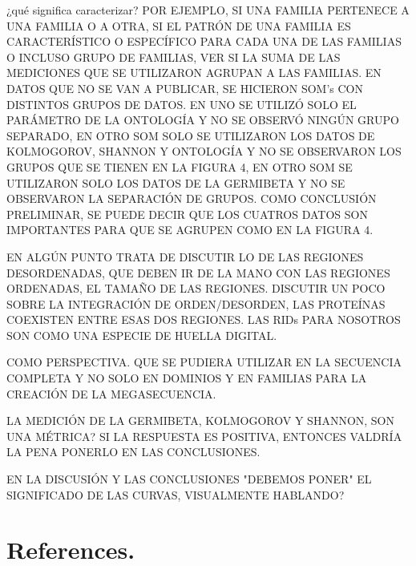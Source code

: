\documentclass[preprint,12pt]{elsarticle}
\begin{document}
¿qué significa caracterizar? POR EJEMPLO, SI UNA FAMILIA PERTENECE A UNA FAMILIA O A OTRA, SI EL PATRÓN DE UNA FAMILIA ES CARACTERÍSTICO O ESPECÍFICO PARA CADA UNA DE LAS FAMILIAS O INCLUSO GRUPO DE FAMILIAS, VER SI LA SUMA DE LAS MEDICIONES QUE SE UTILIZARON AGRUPAN A LAS FAMILIAS.
EN DATOS QUE NO SE VAN A PUBLICAR, SE HICIERON SOM's CON DISTINTOS GRUPOS DE DATOS. EN UNO SE UTILIZÓ SOLO EL PARÁMETRO DE LA ONTOLOGÍA Y NO SE OBSERVÓ NINGÚN GRUPO SEPARADO, EN OTRO SOM SOLO SE UTILIZARON LOS DATOS DE KOLMOGOROV, SHANNON Y ONTOLOGÍA Y NO SE OBSERVARON LOS GRUPOS QUE SE TIENEN EN LA FIGURA 4, EN OTRO SOM SE UTILIZARON SOLO LOS DATOS DE LA GERMIBETA Y NO SE OBSERVARON LA SEPARACIÓN DE GRUPOS. COMO CONCLUSIÓN PRELIMINAR, SE PUEDE DECIR QUE LOS CUATROS DATOS SON IMPORTANTES PARA QUE SE AGRUPEN COMO EN LA FIGURA 4. 

EN ALGÚN PUNTO TRATA DE DISCUTIR LO DE LAS REGIONES DESORDENADAS, QUE DEBEN IR DE LA MANO CON LAS REGIONES ORDENADAS, EL TAMAÑO DE LAS REGIONES. DISCUTIR UN POCO SOBRE LA INTEGRACIÓN DE ORDEN/DESORDEN, LAS PROTEÍNAS COEXISTEN ENTRE ESAS DOS REGIONES. LAS RIDs PARA NOSOTROS SON COMO UNA ESPECIE DE HUELLA DIGITAL. 

COMO PERSPECTIVA. QUE SE PUDIERA UTILIZAR EN LA SECUENCIA COMPLETA Y NO SOLO EN DOMINIOS Y EN FAMILIAS PARA LA CREACIÓN DE LA MEGASECUENCIA. 

LA MEDICIÓN DE LA GERMIBETA, KOLMOGOROV Y SHANNON, SON UNA MÉTRICA? SI LA RESPUESTA ES POSITIVA, ENTONCES VALDRÍA LA PENA PONERLO EN LAS CONCLUSIONES. 

EN LA DISCUSIÓN Y LAS CONCLUSIONES "DEBEMOS PONER" EL SIGNIFICADO DE LAS CURVAS, VISUALMENTE HABLANDO?
\bigbreak


\section{\textbf{References.}}
\label{S:1}







\end{document}
